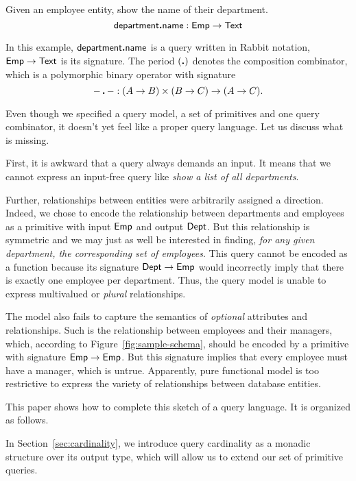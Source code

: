 \begin{demo}
    Given an employee entity, show the name of their department.
    \begin{equation*}
        \textup{\textsf{department}}\boldsymbol{.}\textup{\textsf{name}}: \textup{\textsf{Emp}} \to \textup{\textsf{Text}}
    \end{equation*}
\end{demo}

In this example, $\textup{\textsf{department}}\boldsymbol{.}\textup{\textsf{name}}$ is a query written in Rabbit notation,
$\textup{\textsf{Emp}} \to \textup{\textsf{Text}}$ is its signature.  The period $(\boldsymbol{.})$ denotes the composition
combinator, which is a polymorphic binary operator with signature
\begin{equation*}
        -\,\boldsymbol{.}\,- : (A \to B) \times (B \to C) \to (A \to C).
\end{equation*}

Even though we specified a query model, a set of primitives and one query
combinator, it doesn't yet feel like a proper query language.  Let us discuss
what is missing.

First, it is awkward that a query always demands an input.  It means that we
cannot express an input-free query like \emph{show a list of all departments}.

Further, relationships between entities were arbitrarily assigned a direction.
Indeed, we chose to encode the relationship between departments and employees
as a primitive with input $\textup{\textsf{Emp}}$ and output $\textup{\textsf{Dept}}$.  But this relationship is
symmetric and we may just as well be interested in finding, \emph{for any given
department, the corresponding set of employees}.  This query cannot be encoded
as a function because its signature $\textup{\textsf{Dept}} \to \textup{\textsf{Emp}}$ would incorrectly imply
that there is exactly one employee per department.  Thus, the query model
is unable to express multivalued or \emph{plural} relationships.

The model also fails to capture the semantics of \emph{optional} attributes and
relationships.  Such is the relationship between employees and their managers,
which, according to Figure~\ref{fig:sample-schema}, should be encoded by a
primitive with signature $\textup{\textsf{Emp}} \to \textup{\textsf{Emp}}$.  But this signature implies that
every employee must have a manager, which is untrue.  Apparently, pure
functional model is too restrictive to express the variety of relationships
between database entities.

This paper shows how to complete this sketch of a query language.  It is
organized as follows.

In Section~\ref{sec:cardinality}, we introduce query cardinality as a mo\-nadic
structure over its output type, which will allow us to extend our set of
primitive queries.

